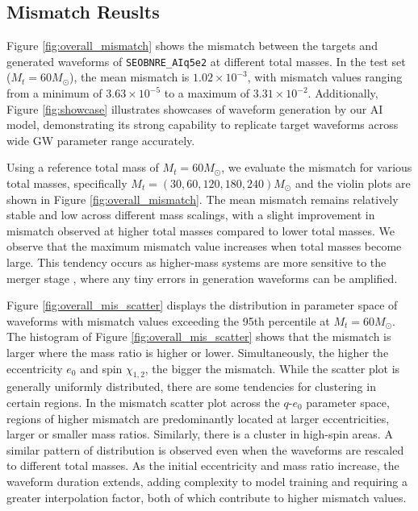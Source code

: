 \documentclass[
reprint,
superscriptaddress,
amsmath,amssymb,
aps,
prd,
floatfix,
]{revtex4-2}
\begin{document}
\subsection{Mismatch Reuslts}

Figure \ref{fig:overall_mismatch} shows the mismatch between the targets and generated waveforms of \texttt{SEOBNRE\_AIq5e2} at different total masses. 
In the test set ($M_t=60M_\odot$), the mean mismatch is $1.02 \times 10^{-3}$, with mismatch values ranging from a minimum of $3.63 \times 10^{-5}$ to a maximum of $3.31 \times 10^{-2}$. 
Additionally, Figure \ref{fig:showcase} illustrates showcases of waveform generation by our AI model, demonstrating its strong capability to replicate target waveforms across wide GW parameter range accurately.

Using a reference total mass of $M_t = 60 M_\odot$, we evaluate the mismatch for various total masses, specifically $M_t = (30, 60, 120, 180, 240) M_\odot$ and the violin plots are shown in Figure \ref{fig:overall_mismatch}.
The mean mismatch remains relatively stable and low across different mass scalings, with a slight improvement in mismatch observed at higher total masses compared to lower total masses. 
We observe that the maximum mismatch value increases when total masses become large. 
This tendency occurs as higher-mass systems are more sensitive to the merger stage \cite{khanGravitationalwaveSurrogateModels2021}, where any tiny errors in generation waveforms can be amplified.

Figure \ref{fig:overall_mis_scatter} displays the distribution in parameter space of waveforms with mismatch values exceeding the 95th percentile at $M_t=60M_{\odot}$. 
The histogram of Figure \ref{fig:overall_mis_scatter} shows that the mismatch is larger where the mass ratio is higher or lower. Simultaneously, the higher the eccentricity $e_0$ and spin $\chi_{1,2}$, the bigger the mismatch.
While the scatter plot is generally uniformly distributed, there are some tendencies for clustering in certain regions. 
In the mismatch scatter plot across the $q$-$e_0$ parameter space, regions of higher mismatch are predominantly located at larger eccentricities, larger or smaller mass ratios. 
Similarly, there is a cluster in high-spin areas. 
A similar pattern of distribution is observed even when the waveforms are rescaled to different total masses. 
As the initial eccentricity and mass ratio increase, the waveform duration extends, adding complexity to model training and requiring a greater interpolation factor, both of which contribute to higher mismatch values.
\end{document}
